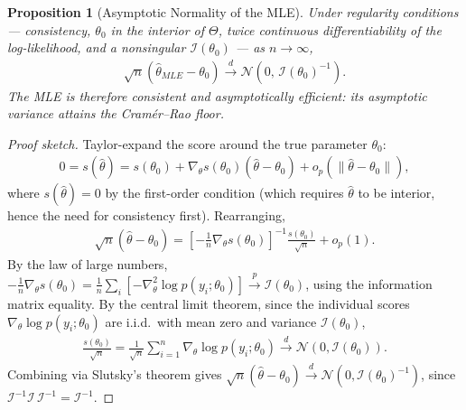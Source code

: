 \documentclass[11pt]{article}
\theoremstyle{definition}
\theoremstyle{plain}
\newtheorem{proposition}{Proposition}[section]
\theoremstyle{remark}
\begin{document}
\begin{proposition}[Asymptotic Normality of the MLE]
    Under regularity conditions --- consistency, $\theta_0$ in the interior of $\Theta$, twice continuous differentiability of the log-likelihood, and a nonsingular $\mathcal{I}(\theta_0)$ --- as $n \to \infty$,
    \begin{align}
        \sqrt{n}(\hat{\theta}_{MLE} - \theta_0) \xrightarrow{d} \mathcal{N}\!\left(0,\, \mathcal{I}(\theta_0)^{-1}\right).
    \end{align}
    The MLE is therefore consistent and asymptotically efficient: its asymptotic variance attains the Cramér--Rao floor.
\end{proposition}
\begin{proof}[Proof sketch]
    Taylor-expand the score around the true parameter $\theta_0$:
    \begin{align}
        0 = s(\hat{\theta}) = s(\theta_0) + \nabla_\theta s(\theta_0)(\hat{\theta}-\theta_0) + o_p(\|\hat{\theta}-\theta_0\|),
    \end{align}
    where $s(\hat{\theta}) = 0$ by the first-order condition (which requires $\hat{\theta}$ to be interior, hence the need for consistency first). Rearranging,
    \begin{align}
        \sqrt{n}(\hat{\theta}-\theta_0) = \left[-\frac{1}{n}\nabla_\theta s(\theta_0)\right]^{-1} \frac{s(\theta_0)}{\sqrt{n}} + o_p(1).
    \end{align}
    By the law of large numbers, $-\frac{1}{n}\nabla_\theta s(\theta_0) = \frac{1}{n}\sum_i[-\nabla^2_\theta\log p(y_i;\theta_0)] \xrightarrow{p} \mathcal{I}(\theta_0)$, using the information matrix equality. By the central limit theorem, since the individual scores $\nabla_\theta\log p(y_i;\theta_0)$ are i.i.d.\ with mean zero and variance $\mathcal{I}(\theta_0)$,
    \begin{align}
        \frac{s(\theta_0)}{\sqrt{n}} = \frac{1}{\sqrt{n}}\sum_{i=1}^n \nabla_\theta\log p(y_i;\theta_0) \xrightarrow{d} \mathcal{N}(0,\mathcal{I}(\theta_0)).
    \end{align}
    Combining via Slutsky's theorem gives $\sqrt{n}(\hat{\theta}-\theta_0) \xrightarrow{d} \mathcal{N}(0,\mathcal{I}(\theta_0)^{-1})$, since $\mathcal{I}^{-1}\mathcal{I}\,\mathcal{I}^{-1} = \mathcal{I}^{-1}$.
\end{proof}
\end{document}
